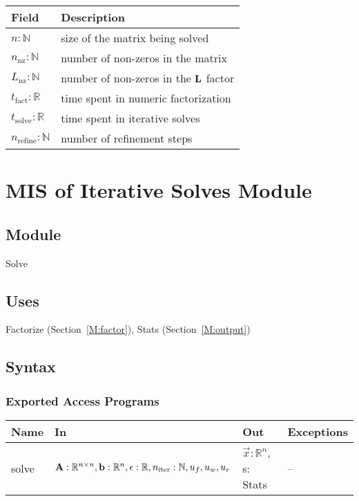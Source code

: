 \documentclass[12pt, titlepage]{article}
\begin{document}
\begin{center}
  \begin{tabular}{p{2cm} p{8cm}}
    \hline
    \textbf{Field}           & \textbf{Description}                                 \\
    \hline
    \(n: \mathbb{N}\)          & size of the matrix being solved                \\
    \(n_\mathrm{nz}: \mathbb{N}\)     & number of non-zeros in the matrix              \\
    \(L_\mathrm{nz}: \mathbb{N}\)     & number of non-zeros in the \(\mathbf{L}\) factor \\
    \(t_\mathrm{fact}: \mathbb{R}\)   & time spent in numeric factorization            \\
    \(t_\mathrm{solve}: \mathbb{R}\)  & time spent in iterative solves                 \\
    \(n_\mathrm{refine}: \mathbb{N}\) & number of refinement steps                     \\
    \hline
  \end{tabular}
\end{center}

\newpage

\section{MIS of Iterative Solves Module} \label{M:solve}

\subsection{Module}

Solve

\subsection{Uses}

Factorize (Section~\ref{M:factor}), Stats (Section~\ref{M:output})

\subsection{Syntax}

\subsubsection{Exported Access Programs}

\begin{center}
  \begin{tabular}{p{2cm} p{8cm} p{3cm} p{2cm}}
    \hline
    \textbf{Name} & \textbf{In}                                                            & \textbf{Out}               & \textbf{Exceptions} \\
    \hline
    solve   & \(\mathbf{A}: \mathbb{R}^{n \times n}, \mathbf{b}: \mathbb{R}^n, \epsilon: \mathbb{R}, n_\mathrm{iter}: \mathbb{N}, u_f, u_w, u_r\) & \(\vec{x}: \mathbb{R}^n\), s: Stats & --            \\
    \hline
  \end{tabular}
\end{center}
\end{document}
